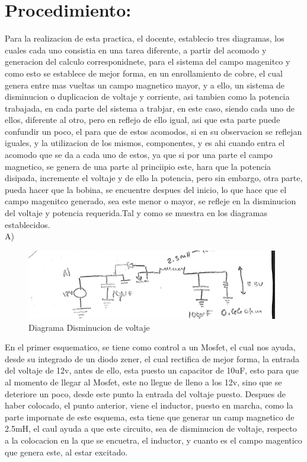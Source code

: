 \documentclass[12pt,a4paper]{article}
\begin{document}
\section{Procedimiento:}

Para la realizacion de esta practica, el docente, establecio tres diagramas, los cuales cada uno consistia en una tarea diferente, a partir del acomodo y generacion del calculo corresponidnete, para el sistema del campo magenitco y como esto se establece de mejor forma, en un enrollamiento de cobre, el cual genera entre mas vueltas un campo magnetico mayor, y a ello, un sistema de disminucion o duplicacion de voltaje y corriente, asi tambien como la potencia trabajada, en cada parte del sistema a trabjar, en este caso, siendo cada uno de ellos, diferente al otro, pero en reflejo de ello igual, asi que esta parte puede confundir un poco, el para que de estos acomodos, si en su observacion se reflejan iguales, y la utilizacion de los mismos, componentes, y es ahi cuando entra el acomodo que se da a cada uno de estos, ya que si por una parte el campo magnetico, se genera de una parte al princiipio este, hara que la potencia disipada, incremente el voltaje y de ello la potencia, pero sin embargo, otra parte, pueda hacer que la bobina, se encuentre despues del inicio, lo que hace que el campo magenitco generado, sea este menor o mayor, se refleje en la disminucion del voltaje y potencia requerida.Tal y como se muestra en los diagramas establecidos.\\

A)\\

\begin{figure}[hbtp]
\centering
\includegraphics[width=11cm]{esquema1.jpeg}
\caption{Diagrama Disminucion de voltaje }
\end{figure}

En el primer esquematico, se tiene como control a un Mosfet, el cual nos ayuda, desde su integrado de un diodo zener, el cual rectifica de mejor forma, la entrada del voltaje de 12v, antes de ello, esta puesto un capacitor de 10uF, esto para que al momento de llegar al Mosfet, este no llegue de lleno a los 12v, sino que se deteriore un poco, desde este punto la entrada del voltaje puesto. Despues de haber colocado, el punto anterior, viene el inductor, puesto en marcha, como la parte impornate de este esquema, esta tiene que generar un camp magnetico de 2.5mH, el caul ayuda a que este circuito, sea de disminucion de voltaje, respecto a la colocacion en la que se encuetra, el inductor, y cuanto es el campo magentico que genera este, al estar excitado.\\
\end{document}
